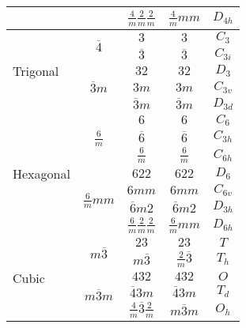 \documentclass[12pt]{article}
\begin{document}
\begin{table}[h]
\begin{tabular}{lcccc}
                               &                                 & $\displaystyle \frac{4}{m}\frac{2}{m}\frac{2}{m}$ & $\displaystyle \frac{4}{m}mm$ & $D_{4h}$ \\ [1.5ex]
    \hline
    \multirow{5}{*}{Trigonal } & \multirow{2}{*}{$\overline{4}$} & $3$ & $3$ & $C_3$\\
                               &                                 & $\overline{3}$ & $\overline{3}$ & $C_{3i}$ \\
                               \cline{2-5}
							  & \multirow{3}{*}{$\overline{3}m$} & $32$ & $32$ & $D_3$\\
                               &                                 & $3m$ & $3m$ & $C_{3v}$ \\
                               &                                 & $\overline{3}m$ & $\overline{3}m$ & $D_{3d}$ \\ 
    \hline
    \multirow{7}{*}{Hexagonal} & \multirow{3}{*}{$\displaystyle \frac{6}{m}$} & $6$ & $6$ & $C_6$\\
                               &                                 & $\overline{6}$ & $\overline{6}$ & $C_{3h}$ \\
                               &                                 & $\displaystyle \frac{6}{m}$ & $\displaystyle \frac{6}{m}$ & $C_{6h}$ \\[1.5ex]
                               \cline{2-5}
							  & \multirow{4}{*}{$\displaystyle \frac{6}{m}mm$} & $622$ & $622$ & $D_6$\\
                               &                                 & $6mm$ & $6mm$ & $C_{6v}$ \\
                               &                                 & $\overline{6}m2$ & $\overline{6}m2$ & $D_{3h}$ \\ 
                               &                                 & $\displaystyle \frac{6}{m}\frac{2}{m}\frac{2}{m}$ & $\displaystyle \frac{6}{m}mm$ & $D_{6h}$ \\  [1.5ex]
    \hline
    \multirow{5}{*}{Cubic}    & \multirow{2}{*}{$m\overline{3}$} & $23$ & $23$ & $T$\\
                               &                                 & $m\overline{3}$ & $\displaystyle \frac{2}{m}\overline{3}$ & $T_h$ \\
                               \cline{2-5}
							  & \multirow{3}{*}{$m\overline{3}m$} & $432$ & $432$ & $O$\\
                               &                                 & $\overline{4}3m$ & $\overline{4}3m$ & $T_d$ \\
                               &                                 & $\displaystyle \frac{4}{m}\overline{3}\frac{2}{m}$ & $m\overline{3}m$ & $O_h$ \\ [1.5ex]
    \hline  
  \end{tabular}
\end{table}
\end{document}
